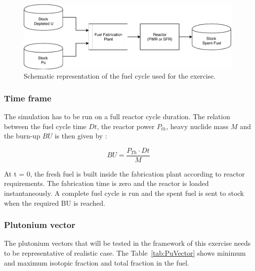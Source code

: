 \documentclass[review]{elsarticle}
\begin{document}
\begin{figure}
    \centering
    \includegraphics[width=0.99\textwidth]{FIG/FuelCycleDiagram.pdf}
    \caption{Schematic representation of the fuel cycle used for the exercise.}
    \label{fig:Scenario}
\end{figure}

\subsubsection{Time frame}

The simulation has to be run on a full reactor cycle duration. The relation between the fuel cycle time $Dt$, the reactor power $P_{th}$, heavy nuclide mass $M$ and the burn-up $BU$ is then given by : 

\begin{equation}
BU = \frac{P_{Th} \cdot Dt}{M}
\end{equation}

At t = 0, the fresh fuel is built inside the fabrication plant according to reactor requirements. The fabrication time is zero and the reactor is loaded instantaneously. A complete fuel cycle is run and the spent fuel is sent to stock when the required BU is reached.

\subsubsection{Plutonium vector}

The plutonium vectors that will be tested in the framework of this exercise needs to be representative of realistic case. The Table~\ref{tab:PuVector} shows minimum and maximum isotopic fraction and total fraction in the fuel. 
\end{document}
